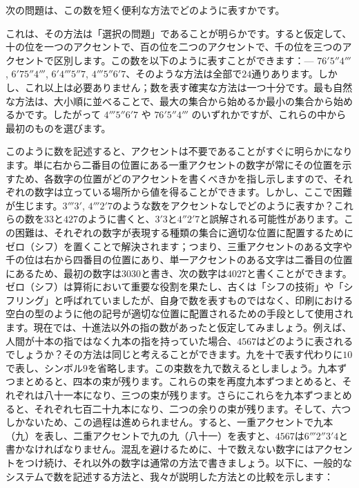 \documentclass[a4paper,11pt,openany]{ltjsbook}
\begin{document}
次の問題は、この数を短く便利な方法でどのように表すかです。



これは、その方法は「選択の問題」であることが明らかです。すると仮定して、十の位を一つのアクセントで、百の位を二つのアクセントで、千の位を三つのアクセントで区別します。この数を以下のように表すことができます：---
$76' 5'' 4'''$, $6' 75'' 4'''$, $6' 4''' 5'' 7$, $4''' 5'' 6' 7$、そのような方法は全部で$24$通りあります。しかし、これ以上は必要ありません；数を表す確実な方法は一つ十分です。最も自然な方法は、大小順に並べることで、最大の集合から始めるか最小の集合から始めるかです。したがって $4''' 5'' 6' 7$ や $76' 5'' 4'''$ のいずれかですが、これらの中から最初のものを選びます。

このように数を記述すると、アクセントは不要であることがすぐに明らかになります。単に右から二番目の位置にある一重アクセントの数字が常にその位置を示すため、各数字の位置がどのアクセントを書くべきかを指し示しますので、それぞれの数字は立っている場所から値を得ることができます。しかし、ここで困難が生じます。$3''' 3'$, $4''' 2' 7$のような数をアクセントなしでどのように表すか？これらの数を$33$と$427$のように書くと、$3' 3$と$4'' 2' 7$と誤解される可能性があります。この困難は、それぞれの数字が表現する種類の集合に適切な位置に配置するためにゼロ（シフ）を置くことで解決されます；つまり、三重アクセントのある文字や千の位は右から四番目の位置にあり、単一アクセントのある文字は二番目の位置にあるため、最初の数字は$3030$と書き、次の数字は$4027$と書くことができます。ゼロ（シフ）は算術において重要な役割を果たし、古くは「シフの技術」や「シフリング」と呼ばれていましたが、自身で数を表すものではなく、印刷における空白の型のように他の記号が適切な位置に配置されるための手段として使用されます。現在では、十進法以外の指の数があったと仮定してみましょう。例えば、人間が十本の指ではなく九本の指を持っていた場合、$4567$はどのように表されるでしょうか？その方法は同じと考えることができます。九を十で表す代わりに$10$で表し、シンボル$9$を省略します。この束数を九で数えるとしましょう。九本ずつまとめると、四本の束が残ります。これらの束を再度九本ずつまとめると、それぞれは八十一本になり、三つの束が残ります。さらにこれらを九本ずつまとめると、それぞれ七百二十九本になり、二つの余りの束が残ります。そして、六つしかないため、この過程は進められません。すると、一重アクセントで九本（九）を表し、二重アクセントで九の九（八十一）を表すと、$4567$は$6''' 2'' 3' 4$と書かなければなりません。混乱を避けるために、十で数えない数字にはアクセントをつけ続け、それ以外の数字は通常の方法で書きましょう。以下に、一般的なシステムで数を記述する方法と、我々が説明した方法との比較を示します：
\end{document}
